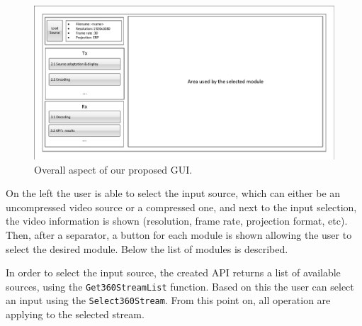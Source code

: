 \documentclass{article}
\begin{document}
\begin{figure}[ht]
    \centering
    \includegraphics[page=1,width=1\textwidth]{Drawings.pdf}
    \caption{Overall aspect of our proposed GUI.}
    \label{fig:overall_gui}
\end{figure}

On the left the user is able to select the input source, which can either be an uncompressed video source or a compressed one, and next to the input selection, the video information is shown (resolution, frame rate, projection format, etc). Then, after a separator, a button for each module is shown allowing the user to select the desired module. Below the list of modules is described. 

In order to select the input source, the created API returns a list of available sources, using the \texttt{Get360StreamList} function. Based on this the user can select an input using the \texttt{Select360Stream}. From this point on, all operation are applying to the selected stream.
 

\end{document}
